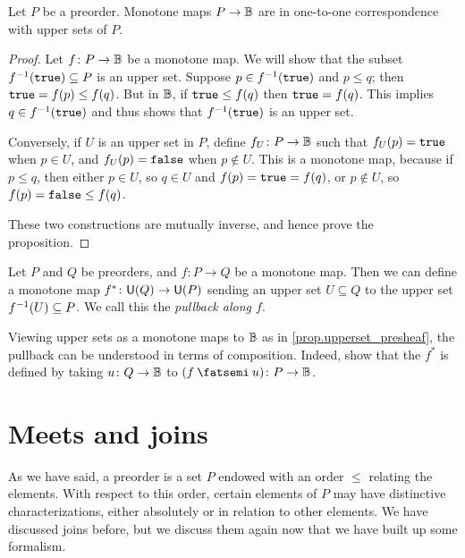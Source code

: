 \documentclass[7Sketches]{subfiles}
\begin{document}
\begin{proposition}%
\label{prop.upperset_presheaf}%
  Let $P$ be a preorder. Monotone maps $P \to \mathbb{B}$ are in one-to-one
  correspondence with upper sets of $P$.
\end{proposition}
\begin{proof}
  Let $f\colon P \to \mathbb{B}$ be a monotone map. We will show that the subset $f^{-1}(\mathtt{true})\subseteq P$ is an upper set. Suppose
$p \in f^{-1}(\mathtt{true})$ and $p \le q$; then $\mathtt{true} = f(p) \le f(q)$. But in $\mathbb{B}$, if $\mathtt{true}\leq f(q)$ then $\mathtt{true}=f(q)$. This implies $q \in f^{-1}(\mathtt{true})$ and thus shows that
$f^{-1}(\mathtt{true})$ is an upper set.

Conversely, if $U$ is an upper set in $P$, define $f_U\colon P \to \mathbb{B}$ such
that $f_U(p) =\mathtt{true}$ when $p \in U$, and $f_U(p) = \mathtt{false}$ when $p\not\in U$. This is a monotone
map, because if $p \le q$, then either $p \in U$, so $q \in U$ and $f(p) = \mathtt{true}= f(q)$,
or $p \notin U$, so $f(p) =\mathtt{false} \le f(q)$.

These two constructions are mutually inverse, and hence prove the proposition.
\end{proof}

\begin{exercise}%
%
\label{exc.pullback_upset}
  Let $P$ and $Q$ be preorders, and $f\colon P \to Q$ be a monotone map. Then we
  can define a monotone map $f^\ast\colon\mathsf{U}(Q) \to \mathsf{U}(P)$ sending an
  upper set $U \subseteq Q$ to the upper set $f^{-1} (U) \subseteq P$. We call this the
  \emph{pullback along $f$}.

  Viewing upper sets as a monotone maps to $\mathbb{B}$ as in \cref{prop.upperset_presheaf}, the pullback can be understood in terms of composition. Indeed, show
  that the $f^\ast$ is defined by taking $u\colon Q \to \mathbb{B}$ to $(f\cp u)
  \colon P \to \bb$. 
\end{exercise}

%

\section{Meets and joins}%
\label{sec.meets_joins}%
%

As we have said, a preorder is a set $P$ endowed with an order $\leq$ relating the
elements. With respect to this order, certain elements of $P$ may have distinctive characterizations, either absolutely or in relation to other elements. We have discussed joins before, but we discuss them again
now that we have built up some formalism.
\end{document}
